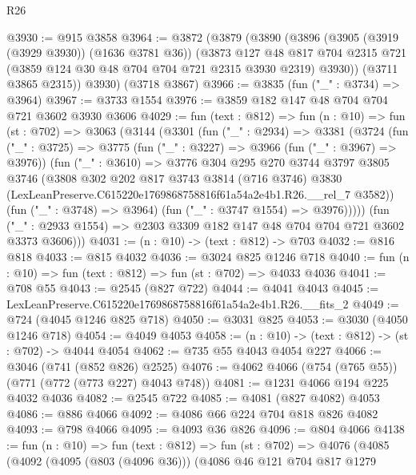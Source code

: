 \begin{lexlean}{R26}
\begin{coremodule}
@3930 := @915 @3858
@3964 := @3872
    (@3879
      (@3890
        (@3896
          (@3905 (@3919 (@3929 @3930)) (@1636 @3781 @36))
          (@3873
            @127
            @48
            @817
            @704
            @2315
            @721
            (@3859 @124 @30 @48 @704 @704 @721 @2315 @3930 @2319)
            @3930))
        (@3711 @3865 @2315))
      @3930)
    (@3718 @3867)
@3966 := @3835 (fun ("_" : @3734) => @3964)
@3967 := @3733 @1554
@3976 := @3859 @182 @147 @48 @704 @704 @721 @3602 @3930 @3606
@4029 := fun (text : @812) =>
  fun (n : @10) =>
  fun (st : @702) =>
  @3063
    (@3144
      (@3301
        (fun ("_" : @2934) =>
        @3381
          (@3724
            (fun ("_" : @3725) =>
            @3775
              (fun ("_" : @3227) => @3966 (fun ("_" : @3967) => @3976))
              (fun ("_" : @3610) =>
              @3776
                @304
                @295
                @270
                @3744
                @3797
                @3805
                @3746
                (@3808
                  @302
                  @202
                  @817
                  @3743
                  @3814
                  (@716 @3746)
                  @3830
                  (LexLeanPreserve.C615220e1769868758816f61a54a2e4b1.R26.__rel_7 @3582))
                (fun ("_" : @3748) => @3964)
                (fun ("_" : @3747 @1554) => @3976)))))
        (fun ("_" : @2933 @1554) => @2303 @3309 @182 @147 @48 @704 @704 @721 @3602 @3373 @3606)))
@4031 := (n : @10) -> (text : @812) -> @703
@4032 := @816 @818
@4033 := @815 @4032
@4036 := @3024 @825 @1246 @718
@4040 := fun (n : @10) => fun (text : @812) => fun (st : @702) => @4033 @4036
@4041 := @708 @55
@4043 := @2545 (@827 @722)
@4044 := @4041 @4043
@4045 := LexLeanPreserve.C615220e1769868758816f61a54a2e4b1.R26.__fits_2
@4049 := @724 (@4045 @1246 @825 @718)
@4050 := @3031 @825
@4053 := @3030 (@4050 @1246 @718)
@4054 := @4049 @4053
@4058 := (n : @10) -> (text : @812) -> (st : @702) -> @4044 @4054
@4062 := @735 @55 @4043 @4054 @227
@4066 := @3046 (@741 (@852 @826) @2525)
@4076 := @4062 @4066 (@754 (@765 @55)) (@771 (@772 (@773 @227) @4043 @748))
@4081 := @1231 @4066 @194 @225 @4032 @4036
@4082 := @2545 @722
@4085 := @4081 (@827 @4082) @4053
@4086 := @886 @4066
@4092 := @4086 @66 @224 @704 @818 @826 @4082
@4093 := @798 @4066
@4095 := @4093 @36 @826
@4096 := @804 @4066
@4138 := fun (n : @10) =>
  fun (text : @812) =>
  fun (st : @702) =>
  @4076
    (@4085
      (@4092
        (@4095 (@803 (@4096 @36)))
        (@4086
          @46
          @121
          @704
          @817
          @1279

\end{coremodule}
\end{lexlean}
